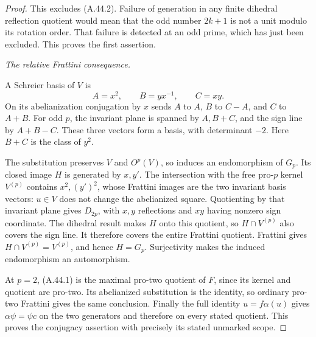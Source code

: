 \begin{proof}
This excludes (A.44.2). Failure of generation
in any finite dihedral reflection quotient
would mean that the odd number \(2k+1\)
is not a unit modulo its rotation order.
That failure is detected at an odd prime,
which has just been excluded. This proves
the first assertion.

\emph{The relative Frattini consequence.}\par
A Schreier basis of \(V\) is
\[
                         A=x^2,\qquad B=yx^{-1},\qquad C=xy.
\]
On its abelianization conjugation by \(x\)
sends \(A\) to \(A\), \(B\) to \(C-A\),
and \(C\) to \(A+B\). For odd \(p\),
the invariant plane is spanned by \(A,B+C\),
and the sign line by \(A+B-C\). These three
vectors form a basis, with determinant \(-2\).
Here \(B+C\) is the class of \(y^2\).

The substitution preserves \(V\) and
\(O^p(V)\), so induces an endomorphism of
\(G_p\). Its closed image \(H\) is generated
by \(x,y'\). The intersection with the free
pro-\(p\) kernel \(V^{(p)}\) contains
\(x^2,(y')^2\), whose Frattini images are
the two invariant basis vectors: \(u\in V\)
does not change the abelianized square.
Quotienting by that invariant plane gives
\(D_{2p}\), with \(x,y\) reflections and
\(xy\) having nonzero sign coordinate.
The dihedral result makes \(H\) onto this
quotient, so \(H\cap V^{(p)}\) also covers
the sign line. It therefore covers the entire
Frattini quotient. Frattini gives
\(H\cap V^{(p)}=V^{(p)}\), and hence
\(H=G_p\). Surjectivity makes the induced
endomorphism an automorphism.

At \(p=2\), (A.44.1) is the maximal pro-two
quotient of \(F\), since its kernel and
quotient are pro-two. Its abelianized
substitution is the identity, so ordinary
pro-two Frattini gives the same conclusion.
Finally the full identity \(u=f\alpha(u)\)
gives \(\alpha\psi=\psi c\) on the two
generators and therefore on every stated
quotient. This proves the conjugacy assertion
with precisely its stated unmarked scope.
\end{proof}
